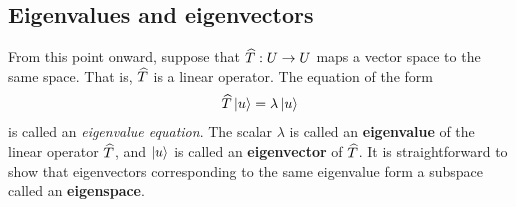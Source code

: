 \begin{comment}
There are two important subspaces associated to a linear map $\op T:U\mapsto V$. 
The {\bf kernel} of $\op T$ is the set of vectors in $U$ that are mapped to the zero vector in $V$. The {\bf image} of $\op T$ is the set of vectors in $V$ that can be written as $T(u)$ for some $u\in U$.

\begin{definition}[\bf Kernel and image]\leavevmode
	\begin{align}
		\ker \op T &= \{u\in U|\op T(u) = 0\} \\
		\textrm{Im} \op T &= \{v\in V|\op T(u)=v\}
	\end{align}
\end{definition}

The kernel and the image are subspaces of $U$ and $V$ respectively. (Prove this.) Furthermore, even though they are subspaces of different vector spaces, we have the follow theorem, which we do not prove here.

\begin{theorem}[\bf Rank-nullity]\leavevmode
	\begin{align}
		\dim \ker \op T + \dim \textrm{Im} \op T = \dim U
	\end{align}
\end{theorem}

One can see that a linear map is invertible iff the kernel is trivial, $\ker \op T = \{0\}$.


$$[AB,CD] = [A,C]BD + A[B,C]D+ C[A,D]B + CA[B,D]$$
\end{comment}


\subsection{Eigenvalues and eigenvectors}

From this point onward, suppose that $\widehat{T}: U\to U$ maps a vector space to the same space. That is, $\widehat{T}$ is a linear operator.
The equation of the form
\begin{align}
	\widehat{T}\ket{u} = \lambda \ket{u}
\end{align}
is called an \emph{eigenvalue equation}. The scalar $\lambda$ is called an {\bf eigenvalue} of the linear operator $\widehat{T}$, and $\ket{u}$ is called an {\bf eigenvector} of $\widehat{T}$. It is straightforward to show that eigenvectors corresponding to the same eigenvalue form a subspace called an {\bf eigenspace}.

